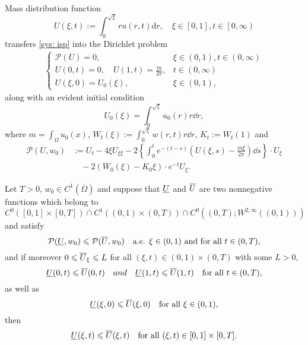 \begin{frame}{Mass distribution function}
\begin{equation}\label{eq: mass distribution function}
	U(\xi, t):=\int_{0}^{\sqrt\xi} r u(r, t) \mathrm{d} r, \quad \xi \in\left[0, 1\right], t \in\left[0, \infty\right)
\end{equation}
transfers \eqref{sys: isp}  into the Dirichlet problem
\begin{align}\label{partial mass pde}
    \begin{cases}
		\mathcal{P}(U) = 0, & \xi \in(0, 1), t \in\left(0, \infty\right)\\
		U(0, t)=0, \quad U\left(1, t\right)=\frac{m}{2\pi}, & t \in\left(0, \infty\right)\\
		U(\xi, 0) = U_0(\xi), & \xi\in(0, 1), 
    \end{cases}
\end{align}
along with an evident initial condition
\begin{equation}\label{partial mass initial data}
	U_0(\xi) = \int_0^{\sqrt\xi}u_0(r)r\dd r,
\end{equation}
where $m = \int_\Omega u_0(x)$, $W_t(\xi):=\int_0^{\sqrt\xi}w(r, t) r\dd {r}$, $K_t:= W_t(1)$ and
\begin{align*}
\mathcal{P}(U, w_0) &:= U_t - 4 \xi U_{\xi \xi} - 2\left\{\int_0^t e^{-(t-s)}\left(U(\xi, s)-\frac{m\xi}{2 \pi}\right) \dd {s}\right\} \cdot U_{\xi} \\
&\quad - 2(W_0(\xi)-K_0 \xi) \cdot e^{-t} U_{\xi}.
\end{align*}
\end{frame}

\begin{frame}
\begin{lemma}
	Let $T>0$, $w_0\in C^1(\overline{\Omega})$ and suppose that $\underline{U}$ and $\overline{U}$ are two nonnegative functions which belong to
\[
    C^0([0, 1]\times [0, T])\cap
    C^1((0, 1)\times(0, T))\cap
    C^0((0, T); W^{2,\infty}((0,1)))
\]
and satisfy
\begin{equation*}
		\mathcal{P}(\underline{U}, w_0) \leqslant \mathcal{P}(\overline{U}, w_0)\quad\text{a.e. } \xi\in(0,1) \text{ and for all } t \in(0, T),
\end{equation*}
and if moreover
\(
  0\leqslant \overline{U}_\xi\leqslant L\) for all  \((\xi,t)\in(0,1)\times(0,T)\)
with some $L>0$,
\begin{equation*}
	\underline{U}(0, t) \leqslant \overline{U}(0, t) \quad{and}\quad\underline{U}(1, t) \leqslant \overline{U}(1, t) \quad\text{for all } t \in(0, T),
\end{equation*}
as well as
\begin{equation*}
	\underline{U}(\xi, 0)\leqslant \overline{U}(\xi, 0) \quad\text{for all }  \xi\in (0, 1),
\end{equation*}
then
\begin{equation*}
	\underline{U} (\xi, t) \leqslant \overline{U} (\xi, t) \quad\text{for all } (\xi, t) \in[0, 1]\times [0, T].
\end{equation*}
\end{lemma}
\end{frame}


